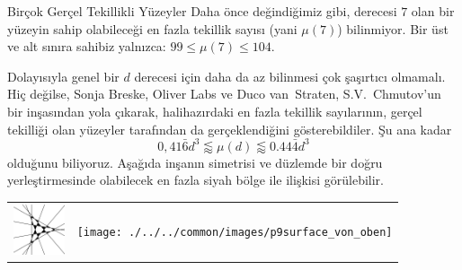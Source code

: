 \begin{surferPage}[216 Tekillik]{Birçok Gerçel Tekillikli Yüzeyler}
Daha önce değindiğimiz gibi, derecesi $7$ olan bir yüzeyin sahip olabileceği en fazla tekillik sayısı (yani $\mu(7)$) bilinmiyor. Bir üst ve alt sınıra sahibiz yalnızca:  $99\le \mu(7) \le 104$. 

Dolayısıyla genel bir $d$ derecesi için daha da az bilinmesi çok şaşırtıcı olmamalı.
Hiç değilse,  Sonja Breske, Oliver Labs ve Duco van~Straten, S.V.\ Chmutov'un bir inşasından yola çıkarak, halihazırdaki en fazla tekillik sayılarının, gerçel tekilliği olan yüzeyler tarafından da gerçeklendiğini gösterebildiler. Şu ana kadar 
    \[0,41\bar{6}d^3 \lessapprox \mu(d) \lessapprox 0.44\bar{4} d^3\]
olduğunu biliyoruz. Aşağıda inşanın simetrisi ve düzlemde bir doğru yerleştirmesinde olabilecek en fazla siyah bölge ile ilişkisi görülebilir.
    \begin{center}
      \begin{tabular}{c@{\qquad}c}
        \includegraphics[height=1.5cm]{./../../common/images/vielesing.pdf}
        &
        \texttt{[image: ./../../common/images/p9surface\_von\_oben]}
      \end{tabular}
    \end{center}
\end{surferPage}
